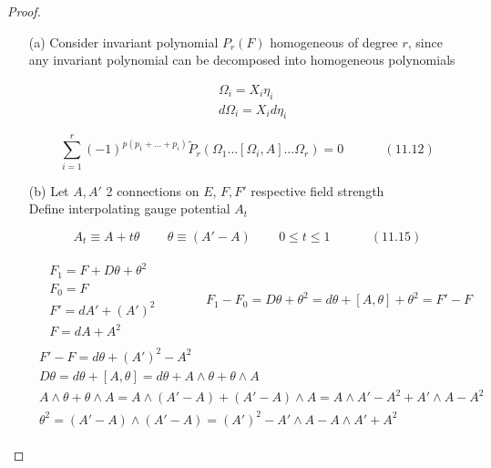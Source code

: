\documentclass[twoside]{amsart}
\begin{document}
\begin{proof}
\begin{enumerate}
\item[(a)] Consider invariant polynomial $P_r(F)$ homogeneous of degree $r$, since any invariant polynomial can be decomposed into homogeneous polynomials 

\[
\begin{aligned}
  & \Omega_i = X_i \eta_i \\ 
  & d\Omega_i = X_i d\eta_i
\end{aligned}
\]

\begin{equation}
  \sum_{i=1}^r (-1)^{ p ( p_1 + \dots + p_i ) } \widetilde{P}_r( \Omega_1 \dots [\Omega_i, A ] \dots \Omega_r ) = 0 \quad \quad \quad \, (11.12)
\end{equation}



\item[(b)] Let $A, A'$ 2 connections on $E$, $F, F'$ respective field strength \\

Define interpolating gauge potential $A_t$ 

\begin{equation}
  A_t \equiv A + t \theta \quad \quad \, \theta \equiv ( A' - A) \quad \quad \, 0 \leq t \leq 1 \quad \quad \quad \, (11.15)
\end{equation}



\[
\begin{gathered}
  \begin{aligned}
    & F_1 = F+ D\theta + \theta^2 \\
    & F_0 = F \\ 
    & F' = dA' + (A')^2 \\ 
    & F = dA + A^2 
\end{aligned}  \quad \quad \quad \, \begin{gathered} F_1 - F_0 = D\theta + \theta^2 = d\theta + [A, \theta] +  \theta^2 = F' - F \end{gathered} \\
\begin{gathered}
  F' - F = d\theta + (A')^2 - A^2 \\ 
D\theta = d\theta + [A, \theta ] = d\theta + A \wedge \theta + \theta \wedge A \\ 
A \wedge \theta +  \theta \wedge A = A \wedge ( A' - A) + (A' - A) \wedge A = A\wedge A' - A^2 + A' \wedge A - A^2 \\
\theta^2 = (A' - A) \wedge (A' - A) = (A')^2 - A' \wedge A - A \wedge A' + A^2
\end{gathered}
\end{gathered}
\]


\end{enumerate}
\end{proof}
\end{document}
